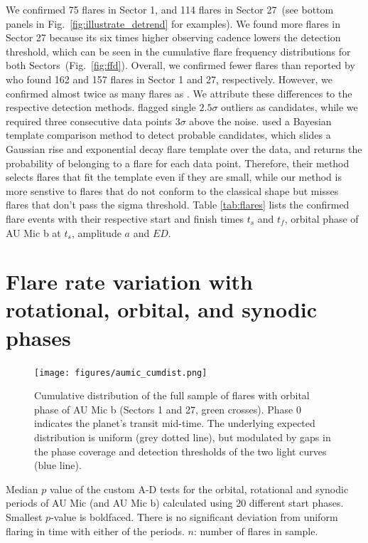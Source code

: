 \documentclass[fleqn,usenatbib]{mnras}%
\begin{document}
We confirmed 75 flares in Sector 1, and 114 flares in Sector 27~(see bottom panels in Fig.~\ref{fig:illustrate_detrend} for examples). We found more flares in Sector 27 because its six times higher observing cadence lowers the detection threshold, which can be seen in the cumulative flare frequency distributions for both Sectors~(Fig.~\ref{fig:ffd}). Overall, we confirmed fewer flares than reported by \citet{martioli2021new} who found 162 and 157 flares in Sector 1 and 27, respectively. However, we confirmed almost twice as many flares as \citet{gilbert2021flares}. We attribute these differences to the respective detection methods. \citet{martioli2021new} flagged single $2.5\sigma$ outliers as candidates, while we required three consecutive data points $3\sigma$ above the noise. \citet{gilbert2021flares} used a Bayesian template comparison method to detect probable candidates, which slides a Gaussian rise and exponential decay flare template over the data, and returns the probability of belonging to a flare for each data point. Therefore, their method selects flares that fit the template even if they are small, while our method is more senstive to flares that do not conform to the classical shape but misses flares that don't pass the sigma threshold. Table \ref{tab:flares} lists the confirmed flare events with their respective start and finish times $t_s$ and $t_f$, orbital phase of AU Mic b at $t_s$, amplitude $a$ and $ED$.

\section{Flare rate variation with rotational, orbital, and synodic phases}
\label{sec:phases}


\begin{figure}
\texttt{[image: figures/aumic\_cumdist.png]} 
\caption{Cumulative distribution of the full sample of flares with orbital phase of AU Mic b (Sectors 1 and 27, green crosses). Phase 0 indicates the planet's transit mid-time. The underlying expected distribution is uniform (grey dotted line), but modulated by gaps in the phase coverage and detection thresholds of the two light curves (blue line).}
\label{fig:cumdist}
\end{figure}

\begin{table}
\caption{Median $p$ value of the custom A-D tests for the orbital, rotational and synodic periods of AU Mic (and AU Mic b) calculated using 20 different start phases. Smallest $p$-value is boldfaced. There is no significant deviation from uniform flaring in time with either of the periods. $n$: number of flares in sample.}
\centering

\label{tab:pvals}
\end{table}
\end{document}
